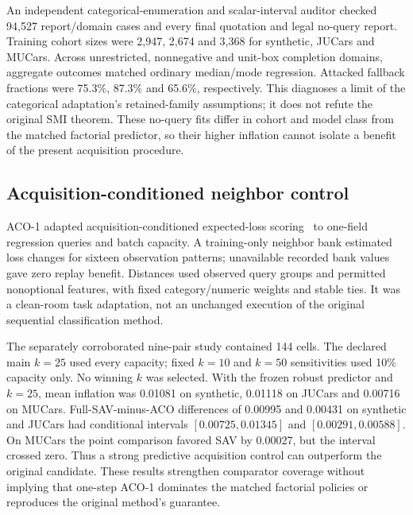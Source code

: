 \documentclass[11pt]{article}
\begin{document}
An independent categorical-enumeration and scalar-interval auditor checked
94,527 report/domain cases and every final quotation and legal no-query report.
Training cohort sizes were 2,947, 2,674 and 3,368 for synthetic, JUCars and
MUCars. Across unrestricted, nonnegative and unit-box completion domains,
aggregate outcomes matched ordinary median/mode regression. Attacked fallback
fractions were 75.3\%, 87.3\% and 65.6\%, respectively. This diagnoses a limit
of the categorical adaptation's retained-family assumptions; it does not
refute the original SMI theorem. These no-query fits differ in cohort and
model class from the matched factorial predictor, so their higher inflation
cannot isolate a benefit of the present acquisition procedure.

\subsection{Acquisition-conditioned neighbor control}
ACO-1 adapted acquisition-conditioned expected-loss scoring~\cite{activeoracle}
to one-field regression queries and batch capacity. A training-only neighbor
bank estimated loss changes for sixteen observation patterns; unavailable
recorded bank values gave zero replay benefit. Distances used observed query
groups and permitted nonoptional features, with fixed category/numeric weights
and stable ties. It was a clean-room task adaptation, not an unchanged execution
of the original sequential classification method.

The separately corroborated nine-pair study contained 144 cells. The declared
main $k=25$ used every capacity; fixed $k=10$ and $k=50$ sensitivities used
10\% capacity only. No winning $k$ was selected. With the frozen robust
predictor and $k=25$, mean inflation was 0.01081 on synthetic, 0.01118 on
JUCars and 0.00716 on MUCars. Full-SAV-minus-ACO differences of 0.00995 and
0.00431 on synthetic and JUCars had conditional intervals
$[0.00725,0.01345]$ and $[0.00291,0.00588]$. On MUCars the point comparison
favored SAV by 0.00027, but the interval crossed zero. Thus a strong predictive
acquisition control can outperform the original candidate. These results
strengthen comparator coverage without implying that one-step ACO-1 dominates
the matched factorial policies or reproduces the original method's guarantee.
\end{document}
